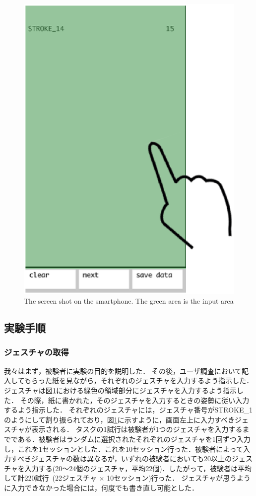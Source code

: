 \begin{figure}[!h]
\centering
\includegraphics[width=0.4\columnwidth]{img/screenshot.eps}
\caption{The screen shot on the smartphone. The green area is the input area}
\label{fig:screenshot}
\end{figure}


\subsection{実験手順}
\subsubsection{ジェスチャの取得}
我々はまず，被験者に実験の目的を説明した．
その後，ユーザ調査において記入してもらった紙を見ながら，それぞれのジェスチャを入力するよう指示した．
ジェスチャは図\ref{fig:screenshot}における緑色の領域部分にジェスチャを入力するよう指示した．
その際，紙に書かれた，そのジェスチャを入力するときの姿勢に従い入力するよう指示した．
それぞれのジェスチャには，ジェスチャ番号がSTROKE\_1のようにして割り振られており，図\ref{fig:screenshot}に示すように，画面左上に入力すべきジェスチャが表示される．
タスクの1試行は被験者が1つのジェスチャを入力するまでである．被験者はランダムに選択されたそれぞれのジェスチャを1回ずつ入力し，これを1セッションとした．これを10セッション行った．被験者によって入力すべきジェスチャの数は異なるが，いずれの被験者においても20以上のジェスチャを入力する(20〜24個のジェスチャ，平均22個)．したがって，被験者は平均して計220試行~(22ジェスチャ $\times$ 10セッション)行った．
ジェスチャが思うように入力できなかった場合には，何度でも書き直し可能とした．

